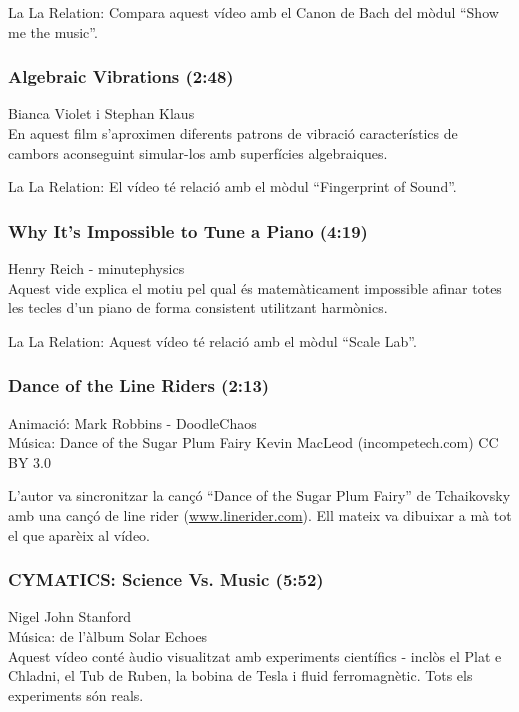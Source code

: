 La La Relation: Compara aquest vídeo amb el Canon de Bach del mòdul ``Show me the music''.

\subsubsection*{Algebraic Vibrations (2:48)}
Bianca Violet i Stephan Klaus\\

En aquest film s'aproximen diferents patrons de vibració característics de cambors aconseguint simular-los amb superfícies algebraiques.

La La Relation: El vídeo té relació amb el mòdul ``Fingerprint of Sound''.

\subsubsection*{Why It's Impossible to Tune a Piano (4:19)}
Henry Reich - minutephysics\\

Aquest vide explica el motiu pel qual és matemàticament impossible afinar totes les tecles d'un piano de forma consistent utilitzant harmònics.

La La Relation: Aquest vídeo té relació amb el mòdul ``Scale Lab''.

\subsubsection*{Dance of the Line Riders (2:13)}
Animació: Mark Robbins - DoodleChaos \\
Música: Dance of the Sugar Plum Fairy Kevin MacLeod (incompetech.com) CC BY 3.0

L'autor va sincronitzar la cançó ``Dance of the Sugar Plum Fairy'' de Tchaikovsky amb una cançó de line rider (\url{www.linerider.com}). Ell mateix va dibuixar a mà tot el que aparèix al vídeo.

\subsubsection*{CYMATICS: Science Vs. Music (5:52)}
Nigel John Stanford \\
Música: de l'àlbum Solar Echoes\\

Aquest vídeo conté àudio visualitzat amb experiments científics - inclòs el Plat e Chladni, el Tub de Ruben, la bobina de Tesla i fluid ferromagnètic. Tots els experiments són reals.

